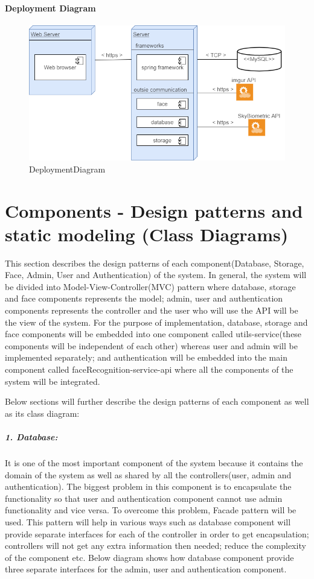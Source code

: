 \documentclass[a4paper,11pt]{article}
\begin{document}
\paragraph{Deployment Diagram}\label{deployment-diagram}

\begin{figure}[ht!]
	\centering
	\includegraphics[width=150mm]{Architecture/DeploymentDiagram.png}
	\caption{DeploymentDiagram}
\end{figure}

\newpage
\section{Components - Design patterns and static modeling (Class Diagrams)}
This section describes the design patterns of each component(Database, Storage, Face, Admin, User and Authentication) of the system. In general, the system will be divided into Model-View-Controller(MVC) pattern where database, storage and face components represents the model; admin, user and authentication components represents the controller and the user who will use the API will be the view of the system. For the purpose of implementation, database, storage and face components will be embedded into one component called utils-service(these components will be independent of each other) whereas user and admin will be implemented separately; and authentication will be embedded into the main component called faceRecognition-service-api where all the components of the system will be integrated.
\newline

\noindent
Below sections will further describe the design patterns of each component as well as its class diagram:

\subparagraph{1. Database: }It is one of the most important component of the system because it contains the domain of the system as well as shared by all the controllers(user, admin and authentication). The biggest problem in this component is to encapsulate the functionality so that user and authentication component cannot use admin functionality and vice versa. To overcome this problem, Facade pattern will be used. This pattern will help in various ways such as database component will provide separate interfaces for each of the controller in order to get encapsulation; controllers will not get any extra information then needed; reduce the complexity of the component etc. Below diagram shows how database component provide three separate interfaces for the admin, user and authentication component.
\end{document}
